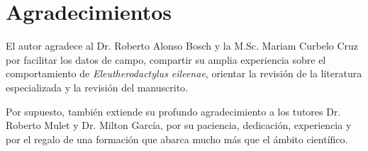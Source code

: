 \chapter*{Agradecimientos}\label{chapter:agradecimientos}


El autor agradece al Dr. Roberto Alonso 
Bosch y la M.Sc. Mariam Curbelo Cruz por facilitar los datos de 
campo, 
compartir su amplia experiencia sobre el 
comportamiento de \emph{Eleutherodactylus 
eileenae}, orientar la revisión de la 
literatura especializada y la revisión del manuscrito.

Por supuesto, también extiende su profundo agradecimiento a los 
tutores Dr. Roberto Mulet y Dr. Milton
García, por su paciencia, dedicación, experiencia y por el regalo 
de una formación que abarca mucho más que el ámbito científico.  